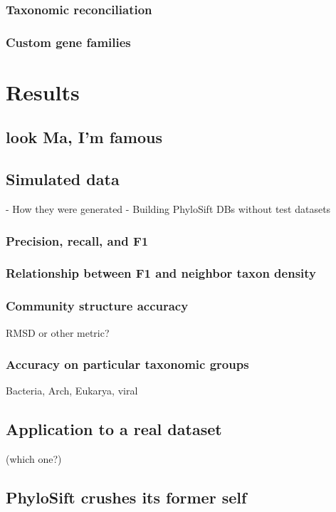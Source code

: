 \documentclass[10pt]{article}
\begin{document}
\subsubsection*{Taxonomic reconciliation}

\subsubsection*{Custom gene families}

\section*{Results}


\subsection*{look Ma, I'm famous}

\subsection*{Simulated data}
    - How they were generated
    - Building PhyloSift DBs without test datasets
\subsubsection*{Precision, recall, and F1}
\subsubsection*{Relationship between F1 and neighbor taxon density}

\subsubsection*{Community structure accuracy}
RMSD or other metric?

\subsubsection*{Accuracy on particular taxonomic groups}
Bacteria, Arch, Eukarya, viral

\subsection*{Application to a real dataset}
 (which one?)

\subsection*{PhyloSift crushes its former self}
\end{document}
